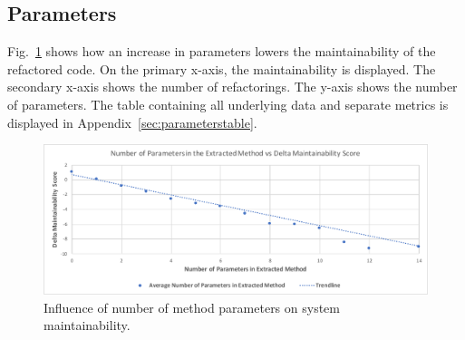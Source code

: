 \subsection{Parameters}
Fig.~\ref{fig:arguments} shows how an increase in parameters lowers the maintainability of the refactored code. On the primary x-axis, the maintainability is displayed. The secondary x-axis shows the number of refactorings. The y-axis shows the number of parameters. The table containing all underlying data and separate metrics is displayed in Appendix~\ref{sec:parameterstable}.

\begin{figure}[H]
  \centering
  \includegraphics[width=0.8\columnwidth]{img/arguments}
  \caption{Influence of number of method parameters on system maintainability.}
  \label{fig:arguments}
\end{figure}
